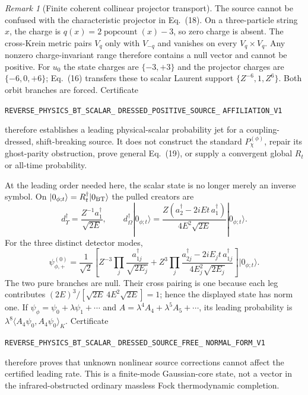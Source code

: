 \documentclass[11pt]{article}
\theoremstyle{definition}
\theoremstyle{remark}
\newtheorem{remark}[theorem]{Remark}
\begin{document}
\begin{remark}[Finite coherent collinear projector transport]
The source cannot be confused with the characteristic projector in
Eq.~(18).  On a three-particle string $x$, the charge is
$q(x)=2\operatorname{popcount}(x)-3$, so zero charge is absent.  The
cross-Krein metric pairs $V_q$ only with $V_{-q}$ and vanishes on every
$V_q\times V_q$.  Any nonzero charge-invariant range therefore contains a
null vector and cannot be positive.  For $u_0$ the state charges are
$\{-3,+3\}$ and the projector charges are $\{-6,0,+6\}$; Eq.~(16) transfers
these to scalar Laurent support $\{Z^{-6},1,Z^6\}$.  Both orbit branches are
forced.  Certificate
\par\noindent
\texttt{REVERSE\_PHYSICS\_BT\_SCALAR\_}
\allowbreak\texttt{DRESSED\_POSITIVE\_SOURCE\_}
\allowbreak\texttt{AFFILIATION\_V1}
\par\noindent
therefore establishes a leading physical-scalar probability jet for a
coupling-dressed, shift-breaking source.  It does not construct the standard
$P_\chi^{(\phi)}$, repair its ghost-parity obstruction, prove general
Eq.~(19), or supply a convergent global $R_t$ or all-time probability.

At the leading order needed here, the scalar state is no longer merely an
inverse symbol.  On
$|0_{\phi;t}\rangle=R_t^\dagger|0_{\rm BT}\rangle$ the pulled creators are
\[
 d_\Upsilon^\dagger=\frac{Z^{-1}a_1^\dagger}{\sqrt{2E}},\qquad
 d_\Omega^\dagger|0_{\phi;t}\rangle
 =\frac{Z(a_2^\dagger-2iEt\,a_1^\dagger)}
 {4E^2\sqrt{2E}}|0_{\phi;t}\rangle.
\]
For the three distinct detector modes,
\[
 \psi_{\phi,+}^{(0)}=\frac1{\sqrt2}\left[
 Z^{-3}\prod_j\frac{a_{1j}^\dagger}{\sqrt{2E_j}}
 +Z^3\prod_j\frac{a_{2j}^\dagger-2iE_jt\,a_{1j}^\dagger}
 {4E_j^2\sqrt{2E_j}}
 \right]|0_{\phi;t}\rangle.
\]
The two pure branches are null.  Their cross pairing is one because each leg
contributes
$(2E)^3/[\sqrt{2E}\,4E^2\sqrt{2E}]=1$; hence the displayed state has norm
one.  If $\psi_\phi=\psi_0+\lambda\psi_1+\cdots$ and
$A=\lambda^4A_4+\lambda^5A_5+\cdots$, its leading probability is
$\lambda^8\langle A_4\psi_0,A_4\psi_0\rangle_K$.  Certificate
\par\noindent
\texttt{REVERSE\_PHYSICS\_BT\_SCALAR\_}
\allowbreak\texttt{DRESSED\_SOURCE\_FREE\_}
\allowbreak\texttt{NORMAL\_FORM\_V1}
\par\noindent
therefore proves that unknown nonlinear source corrections cannot affect the
certified leading rate.  This is a finite-mode Gaussian-core state, not a
vector in the infrared-obstructed ordinary massless Fock thermodynamic
completion.


\end{remark}
\end{document}
